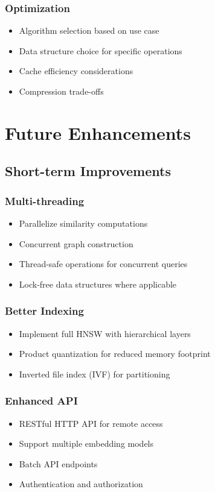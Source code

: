 \documentclass[12pt,a4paper]{article}
\begin{document}
\subsubsection{Optimization}
\begin{itemize}
    \item Algorithm selection based on use case
    \item Data structure choice for specific operations
    \item Cache efficiency considerations
    \item Compression trade-offs
\end{itemize}

\section{Future Enhancements}

\subsection{Short-term Improvements}

\subsubsection{Multi-threading}
\begin{itemize}
    \item Parallelize similarity computations
    \item Concurrent graph construction
    \item Thread-safe operations for concurrent queries
    \item Lock-free data structures where applicable
\end{itemize}

\subsubsection{Better Indexing}
\begin{itemize}
    \item Implement full HNSW with hierarchical layers
    \item Product quantization for reduced memory footprint
    \item Inverted file index (IVF) for partitioning
\end{itemize}

\subsubsection{Enhanced API}
\begin{itemize}
    \item RESTful HTTP API for remote access
    \item Support multiple embedding models
    \item Batch API endpoints
    \item Authentication and authorization
\end{itemize}
\end{document}
